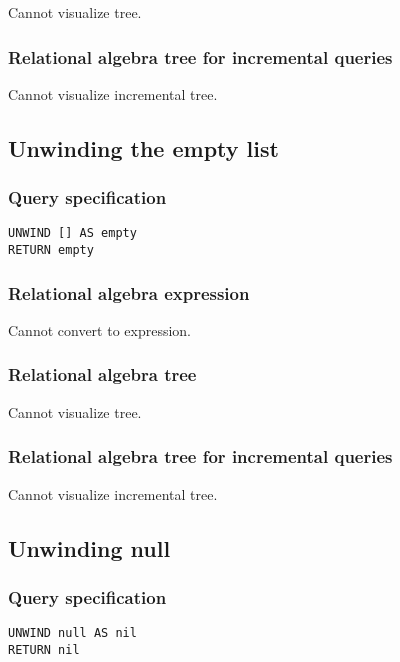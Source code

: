 Cannot visualize tree.

\subsubsection*{Relational algebra tree for incremental queries}

Cannot visualize incremental tree.

\subsection{Unwinding the empty list}

\subsubsection*{Query specification}

\begin{lstlisting}
UNWIND [] AS empty
RETURN empty
\end{lstlisting}

\subsubsection*{Relational algebra expression}

Cannot convert to expression.

\subsubsection*{Relational algebra tree}

Cannot visualize tree.

\subsubsection*{Relational algebra tree for incremental queries}

Cannot visualize incremental tree.

\subsection{Unwinding null}

\subsubsection*{Query specification}

\begin{lstlisting}
UNWIND null AS nil
RETURN nil
\end{lstlisting}

